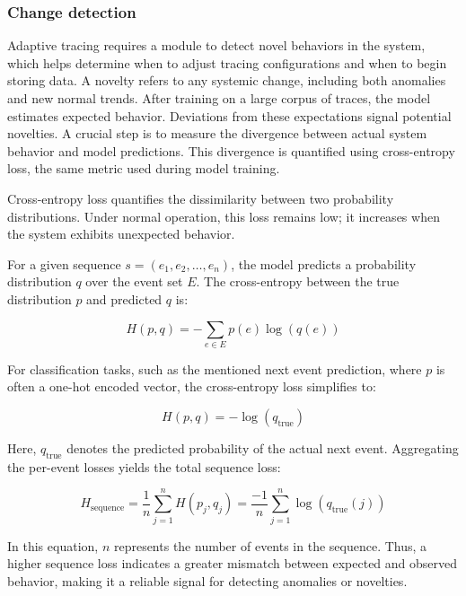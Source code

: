 \documentclass[preprint,12pt]{elsarticle}
\begin{document}
\subsubsection{Change detection}
Adaptive tracing requires a module to detect novel behaviors in the system, which helps determine when to adjust tracing configurations and when to begin storing data. A novelty refers to any systemic change, including both anomalies and new normal trends. After training on a large corpus of traces, the model estimates expected behavior. Deviations from these expectations signal potential novelties. A crucial step is to measure the divergence between actual system behavior and model predictions. This divergence is quantified using cross-entropy loss, the same metric used during model training.

Cross-entropy loss quantifies the dissimilarity between two probability distributions. Under normal operation, this loss remains low; it increases when the system exhibits unexpected behavior.

For a given sequence $s = (e_1, e_2, \ldots, e_n)$, the model predicts a probability distribution $q$ over the event set $E$. The cross-entropy between the true distribution $p$ and predicted $q$ is:

\begin{equation}
H(p, q) = -\sum_{e \in E} p(e) \log(q(e))
\end{equation}


For classification tasks, such as the mentioned next event prediction, where $p$ is often a one-hot encoded vector, the cross-entropy loss simplifies to:

\begin{equation}
H(p, q) = -\log(q_{\text{true}})
\end{equation}

Here, $q_{\text{true}}$ denotes the predicted probability of the actual next event. Aggregating the per-event losses yields the total sequence loss:

\begin{equation}
H_{\text{sequence}} = \frac{1}{n}\sum_{j=1}^{n} H(p_j, q_j) = \frac{-1}{n}\sum_{j=1}^{n}\log(q_{\text{true}}(j))
\end{equation}

In this equation, $n$ represents the number of events in the sequence. Thus, a higher sequence loss indicates a greater mismatch between expected and observed behavior, making it a reliable signal for detecting anomalies or novelties.
\end{document}
